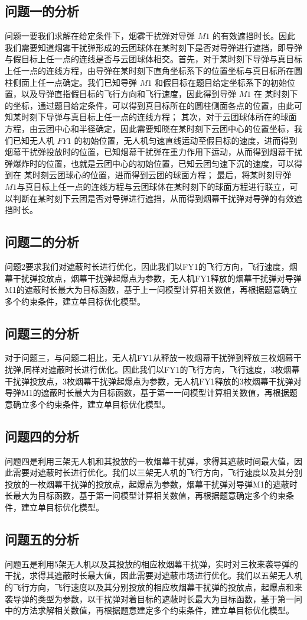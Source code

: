 \documentclass[../main.tex]{subfiles}
\begin{document}
\subsection{问题一的分析}
\par 问题一要我们求解在给定条件下，烟雾干扰弹对导弹 \( M1 \) 的有效遮挡时长。因此我们需要知道烟雾干扰弹形成的云团球体在某时刻下是否对导弹进行遮挡，即导弹与假目标上任一点的连线是否与云团球体相交。首先，对于某时刻下导弹与真目标上任一点的连线方程，由导弹在某时刻下直角坐标系下的位置坐标与真目标所在圆柱侧面上任一点确定。我们已知导弹 \( M1 \) 和假目标在题目给定坐标系下的初始位置，以及导弹直指假目标的飞行方向和飞行速度，因此得到导弹 \( M1 \) 在 某时刻下的坐标，通过题目给定条件，可以得到真目标所在的圆柱侧面各点的位置，由此可知某时刻下导弹与真目标上任一点的连线方程；
其次，对于云团球体所在的球面方程，由云团中心和半径确定，因此需要知晓在某时刻下云团中心的位置坐标，我们已知无人机 \( FY1 \) 的初始位置，无人机匀速直线运动至假目标的速度，进而得到烟幕干扰弹投放时的位置，已知烟幕干扰弹在重力作用下运动，从而得到烟幕干扰弹爆炸时的位置，也就是云团中心的初始位置，已知云团匀速下沉的速度，可以得到在 某时刻云团球心的位置，进而得到云团的球面方程；
最后，将某时刻导弹\( M1 \)与真目标上任一点的连线方程与云团球体在某时刻下的球面方程进行联立，可以判断在某时刻下云团是否对导弹进行遮挡，从而得到烟幕干扰弹对导弹的有效遮挡时长。
\subsection{问题二的分析}
\par 问题2要求我们对遮蔽时长进行优化，因此我们以FY1的飞行方向，飞行速度，烟幕干扰弹投放点，烟幕干扰弹起爆点为参数，无人机FY1释放的烟幕干扰弹对导弹M1的遮蔽时长最大为目标函数，基于上一问模型计算相关数值，再根据题意确立多个约束条件，建立单目标优化模型。




\subsection{问题三的分析}
对于问题三，与问题二相比，无人机FY1从释放一枚烟幕干扰弹到释放三枚烟幕干扰弹,同样对遮蔽时长进行优化。因此我们以FY1的飞行方向，飞行速度，3枚烟幕干扰弹投放点，3枚烟幕干扰弹起爆点为参数，无人机FY1释放的3枚烟幕干扰弹对导弹M1的遮蔽时长最大为目标函数，基于第一一问模型计算相关数值，再根据题意确立多个约束条件，建立单目标优化模型。



\subsection{问题四的分析}
问题四是利用三架无人机和其投放的一枚烟幕干扰弹，求得其遮蔽时间最大值，因此需要对遮蔽时长进行优化。我们以三架无人机的飞行方向，飞行速度以及其分别投放的一枚烟幕干扰弹的投放点，起爆点为参数，烟幕干扰弹对导弹M1的遮蔽时长最大为目标函数，基于第一问模型计算相关数值，再根据题意确定多个约束条件，建立单目标优化模型。



\subsection{问题五的分析}  
 问题五是利用5架无人机以及其投放的相应枚烟幕干扰弹，实时对三枚来袭导弹的干扰，求得其遮蔽时长最大值，因此需要对遮蔽市场进行优化。我们以五架无人机的飞行方向，飞行速度以及其分别投放的相应枚烟幕干扰弹的投放点，起爆点和来袭导弹的类型为参数，以干扰弹对着目标的遮蔽时长最大为目标函数，基于第一问中的方法求解相关数值，再根据题意建定多个约束条件，建立单目标优化模型。
\end{document}
